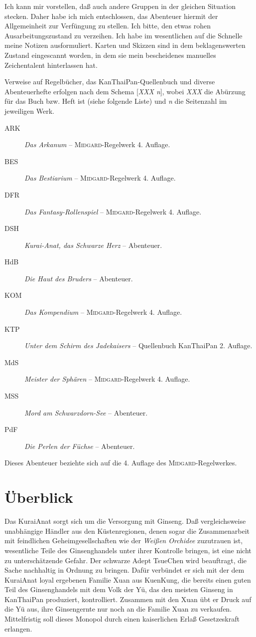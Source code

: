 \documentclass[
a4paper,
twoside,
DIV=calc,
BCOR=4mm,
fontsize=9pt,
twocolumn=on,
titlepage=on,
parskip=half
]{scrartcl}
\newcommand{\midgard}{\textsc{Midgard}}
\begin{document}
Ich kann mir vorstellen, daß auch andere Gruppen in der gleichen
Situation stecken. Daher habe ich mich entschlossen, das Abenteuer
hiermit der Allgemeinheit zur Verfüngung zu stellen. Ich bitte, den
etwas rohen Ausarbeitungszustand zu verzeihen. Ich habe im
wesentlichen auf die Schnelle meine Notizen ausformuliert. Karten und
Skizzen sind in dem beklagenswerten Zustand eingescannt worden, in dem
sie mein bescheidenes manuelles Zeichentalent hinterlassen hat.

Verweise auf Regelbücher, das KanThaiPan-Quellenbuch und diverse
Abenteuerhefte erfolgen nach dem Schema [\emph{XXX n}], wobei
\emph{XXX} die Abürzung für das Buch bzw. Heft ist (siehe folgende
Liste) und \emph{n} die Seitenzahl im jeweiligen Werk.

\begin{description}
\item[ARK] \emph{Das Arkanum} -- \midgard-Regelwerk 4. Auflage.
\item[BES] \emph{Das Bestiarium} -- \midgard-Regelwerk 4. Auflage.
\item[DFR] \emph{Das Fantasy-Rollenspiel} -- \midgard-Regelwerk 4. Auflage.
\item[DSH] \emph{Kurai-Anat, das Schwarze Herz} -- Abenteuer.
\item[HdB] \emph{Die Haut des Bruders} -- Abenteuer.
\item[KOM] \emph{Das Kompendium} -- \midgard-Regelwerk 4. Auflage.
\item[KTP] \emph{Unter dem Schirm des Jadekaisers} -- Quellenbuch
  KanThaiPan 2. Auflage.
\item[MdS] \emph{Meister der Sphären} -- \midgard-Regelwerk 4. Auflage.
\item[MSS] \emph{Mord am Schwarzdorn-See} -- Abenteuer.
\item[PdF] \emph{Die Perlen der Füchse} -- Abenteuer.
\end{description}

Dieses Abenteuer beziehte sich auf die 4. Auflage des \midgard-Regelwerkes.

\section{Überblick}

Das KuraiAnat sorgt sich um die Versorgung mit Ginseng. Daß
vergleichsweise unabhängige Händler aus den Küstenregionen, denen
sogar die Zusammenarbeit mit feindlichen Geheimgesellschaften wie der
\emph{Weißen Orchidee} zuzutrauen ist, wesentliche Teile des
Ginsenghandels unter ihrer Kontrolle bringen, ist eine nicht zu
unterschätzende Gefahr. Der schwarze Adept TsueChen wird beauftragt,
die Sache nachhaltig in Ordnung zu bringen. Dafür verbündet er sich
mit der dem KuraiAnat loyal ergebenen Familie Xuan aus KuenKung, die
bereits einen guten Teil des Ginsenghandels mit dem Volk der Yü, das
den meisten Ginseng in KanThaiPan produziert, kontrolliert. Zusammen
mit den Xuan übt er Druck auf die Yü aus, ihre Ginsengernte nur noch
an die Familie Xuan zu verkaufen. Mittelfristig soll dieses Monopol
durch einen kaiserlichen Erlaß Gesetzeskraft erlangen.
\end{document}
